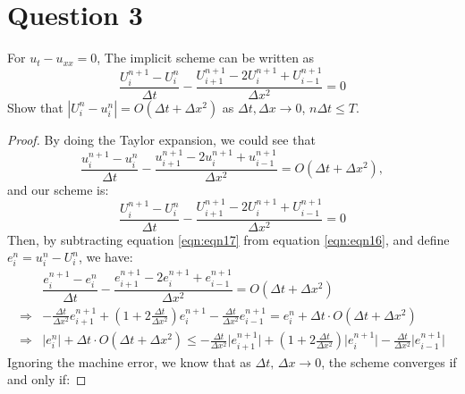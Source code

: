 \section{Question 3}

\begin{question}
    For $u_t-u_{x x}=0$,
    The implicit scheme can be written as
    $$
    \frac{U_i^{n+1}-U_i^n}{\Delta t}-\frac{U_{i+1}^{n+1}-2 U_i^{n+1}+U_{i-1}^{n+1}}{\Delta x^2}=0
    $$
    Show that $\left|U_i^n-u_i^n\right|=O\left(\Delta t+\Delta x^2\right)$ as $\Delta t, \Delta x \rightarrow 0$, $n \Delta t \leqslant T .$
\end{question}

\begin{answer}
    \begin{proof}
        By doing the Taylor expansion, we could see that
        \begin{equation}\label{eqn:eqn16}
            \dfrac{u_i^{n+1}-u_i^n}{\Delta t}-\dfrac{u_{i+1}^{n+1}-2 u_i^{n+1}+u_{i-1}^{n+1}}{\Delta x^2}=O(\Delta t + \Delta x^2),
        \end{equation}
        and our scheme is:
        \begin{equation}\label{eqn:eqn17}
            \dfrac{U_i^{n+1}-U_i^n}{\Delta t}-\dfrac{U_{i+1}^{n+1}-2 U_i^{n+1}+U_{i-1}^{n+1}}{\Delta x^2}=0
        \end{equation}
        Then, by subtracting equation \ref{eqn:eqn17} from equation \ref{eqn:eqn16}, and define $e_i^n = u_i^n - U_i^n$, we have:
        \begin{equation}
            \begin{aligned}
                &\dfrac{e_i^{n+1}-e_i^n}{\Delta t}-\dfrac{e_{i+1}^{n+1}-2 e_i^{n+1}+e_{i-1}^{n+1}}{\Delta x^2}=O(\Delta t + \Delta x^2)\\
                \Rightarrow &-\tfrac{\Delta t}{\Delta x^2}e_{i+1}^{n+1} + (1+2\tfrac{\Delta t}{\Delta x^2})e_{i}^{n+1} - \tfrac{\Delta t}{\Delta x^2}e_{i-1}^{n+1} = e_{i}^{n} + \Delta t \cdot O(\Delta t + \Delta x^2)\\
                \Rightarrow &\lvert e_{i}^{n} \rvert + \Delta t \cdot O(\Delta t + \Delta x^2) \leq -\tfrac{\Delta t}{\Delta x^2}\lvert e_{i+1}^{n+1}\rvert + (1+2\tfrac{\Delta t}{\Delta x^2})\lvert e_{i}^{n+1}\rvert - \tfrac{\Delta t}{\Delta x^2} \lvert e_{i-1}^{n+1} \rvert
            \end{aligned}
        \end{equation}
        Ignoring the machine error, we know that as $\Delta t,\, \Delta x \to 0$, the scheme converges if and only if: 

\end{proof}
\end{answer}

